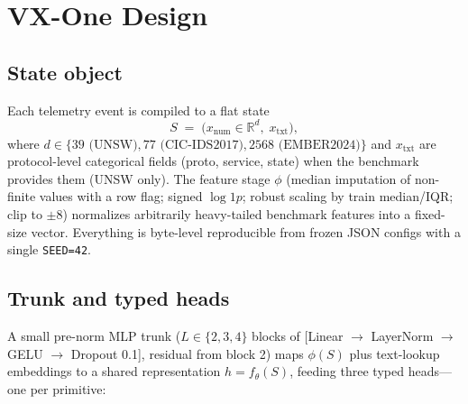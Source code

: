 \documentclass[sigconf,anonymous=false]{acmart}
\begin{document}
\section{VX-One Design}
\label{sec:design}

\subsection{State object}
Each telemetry event is compiled to a flat state
\[
S \;=\; \bigl(x_{\mathrm{num}} \in \mathbb{R}^{d},\; x_{\mathrm{txt}}\bigr),
\]
where $d \in \{39 \text{ (UNSW)}, 77 \text{ (CIC-IDS2017)}, 2568 \text{ (EMBER2024)}\}$ and $x_{\mathrm{txt}}$ are protocol-level categorical fields (proto, service, state) when the benchmark provides them (UNSW only). The feature stage $\phi$ (median imputation of non-finite values with a row flag; signed $\log 1p$; robust scaling by train median/IQR; clip to $\pm8$) normalizes arbitrarily heavy-tailed benchmark features into a fixed-size vector. Everything is byte-level reproducible from frozen JSON configs with a single \texttt{SEED=42}.

\subsection{Trunk and typed heads}
A small pre-norm MLP trunk ($L\in\{2,3,4\}$ blocks of [Linear $\to$ LayerNorm $\to$ GELU $\to$ Dropout 0.1], residual from block 2) maps $\phi(S)$ plus text-lookup embeddings to a shared representation $h = f_\theta(S)$, feeding three typed heads---one per primitive:
\end{document}
